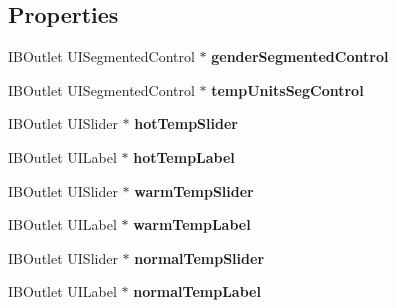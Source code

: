 \subsection*{Properties}
\begin{DoxyCompactItemize}
\item 
\hypertarget{category_profile_view_controller_07_08_afade1346814bb19908adb2a80592b588}{I\-B\-Outlet U\-I\-Segmented\-Control $\ast$ {\bfseries gender\-Segmented\-Control}}\label{category_profile_view_controller_07_08_afade1346814bb19908adb2a80592b588}

\item 
\hypertarget{category_profile_view_controller_07_08_a1f6259c4ee51c1c87b1e80b68fa08df6}{I\-B\-Outlet U\-I\-Segmented\-Control $\ast$ {\bfseries temp\-Units\-Seg\-Control}}\label{category_profile_view_controller_07_08_a1f6259c4ee51c1c87b1e80b68fa08df6}

\item 
\hypertarget{category_profile_view_controller_07_08_a62fb51366cd4d0179175cf35537ef632}{I\-B\-Outlet U\-I\-Slider $\ast$ {\bfseries hot\-Temp\-Slider}}\label{category_profile_view_controller_07_08_a62fb51366cd4d0179175cf35537ef632}

\item 
\hypertarget{category_profile_view_controller_07_08_a497d03279c625051a88ce9b56687f045}{I\-B\-Outlet U\-I\-Label $\ast$ {\bfseries hot\-Temp\-Label}}\label{category_profile_view_controller_07_08_a497d03279c625051a88ce9b56687f045}

\item 
\hypertarget{category_profile_view_controller_07_08_aa3d25b97cba911a3af38912b1f059f7b}{I\-B\-Outlet U\-I\-Slider $\ast$ {\bfseries warm\-Temp\-Slider}}\label{category_profile_view_controller_07_08_aa3d25b97cba911a3af38912b1f059f7b}

\item 
\hypertarget{category_profile_view_controller_07_08_ac994f98d8cdabb165059be14863b4e4b}{I\-B\-Outlet U\-I\-Label $\ast$ {\bfseries warm\-Temp\-Label}}\label{category_profile_view_controller_07_08_ac994f98d8cdabb165059be14863b4e4b}

\item 
\hypertarget{category_profile_view_controller_07_08_a22464da0e5a89b0440f9b4d1b8df702c}{I\-B\-Outlet U\-I\-Slider $\ast$ {\bfseries normal\-Temp\-Slider}}\label{category_profile_view_controller_07_08_a22464da0e5a89b0440f9b4d1b8df702c}

\item 
\hypertarget{category_profile_view_controller_07_08_a83aac2bb65b452dda4c652f8ca2f43f1}{I\-B\-Outlet U\-I\-Label $\ast$ {\bfseries normal\-Temp\-Label}}\label{category_profile_view_controller_07_08_a83aac2bb65b452dda4c652f8ca2f43f1}


\end{DoxyCompactItemize}
